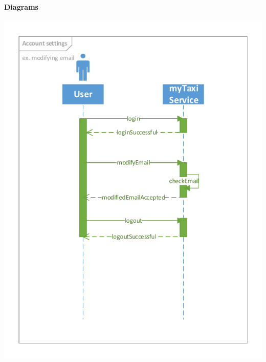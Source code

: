 	\paragraph{Diagrams}
		\begin{center}
			\includegraphics[width=\textwidth]{diagrams/account_settings}
		\end{center}
	
